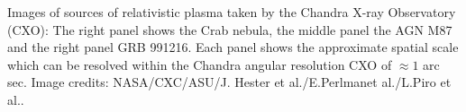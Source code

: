 \label{fig:rescomp}
Images of sources of relativistic plasma taken by the Chandra X-ray Observatory (CXO): The right panel shows the Crab nebula, the middle panel the AGN M87 and the right panel GRB 991216. Each panel shows the approximate spatial scale which can be resolved within the Chandra angular resolution CXO of $\approx1$ arc sec. Image credits: NASA/CXC/ASU/J. Hester et al./E.Perlmanet al./L.Piro et al..